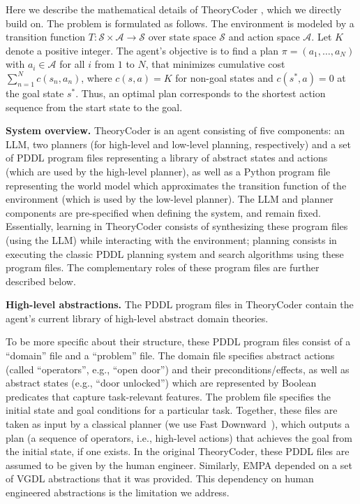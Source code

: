 \documentclass{article}
\theoremstyle{plain}
\theoremstyle{definition}
\theoremstyle{remark}
\begin{document}
Here we describe the mathematical details of TheoryCoder \citep{ahmed2025synthesizing}, which we directly build on.
The problem is formulated as follows. The environment is modeled by a transition function 
$T: \mathcal{S} \times \mathcal{A} \rightarrow \mathcal{S}$ over state space $\mathcal{S}$ and action space $\mathcal{A}$. 
Let $K$ denote a positive integer.
The agent’s objective is to find a plan $\pi = (a_1, \ldots, a_N)$ with $a_i \in \mathcal{A}$ for all $i$ from $1$ to $N$, that minimizes cumulative cost 
$\sum_{n=1}^N c(s_n, a_n)$, where $c(s,a) = K$ for non-goal states and $c(s^\ast,a) = 0$ at the goal state $s^\ast$.
Thus, an optimal plan corresponds to the shortest action sequence from the start state to the goal.


\textbf{System overview.} TheoryCoder is an agent consisting of five components: an LLM, two planners (for high-level and low-level planning, respectively) and a set of PDDL program files representing a library of abstract states and actions (which are used by the high-level planner), as well as a Python program file representing the world model which approximates the transition function of the environment (which is used by the low-level planner). The LLM and planner components are pre-specified when defining the system, and remain fixed. Essentially, learning in TheoryCoder consists of synthesizing these program files (using the LLM) while interacting with the environment; planning consists in executing the classic PDDL planning system and search algorithms using these program files.
The complementary roles of these program files are further described below.


\textbf{High-level abstractions.} 
The PDDL program files in TheoryCoder contain the agent's current library of high-level abstract domain theories.

To be more specific about their structure, these PDDL program files consist of a ``domain'' file and a ``problem'' file. The domain file specifies abstract actions (called ``operators'', e.g., ``open door'') and their preconditions/effects, as well as abstract states (e.g., ``door unlocked'') which are represented by Boolean predicates that capture task-relevant features. The problem file specifies the initial state and goal conditions for a particular task. Together, these files are taken as input by a classical planner (we use Fast Downward~\citep{helmert2006fast}), which outputs a plan (a sequence of operators, i.e., high-level actions) that achieves the goal from the initial state, if one exists.
In the original TheoryCoder, these PDDL files are assumed to be given by the human engineer. Similarly, EMPA depended on a set of VGDL abstractions that it was provided. This dependency on human engineered abstractions is the limitation we address.
\end{document}
